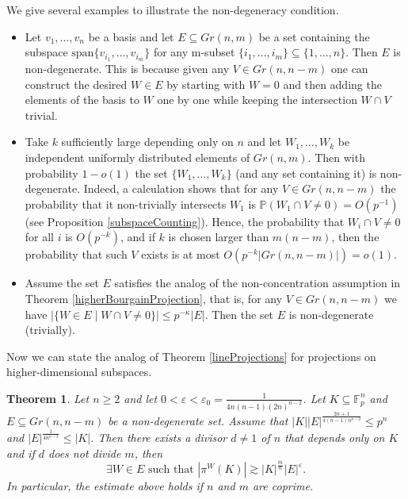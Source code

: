 \documentclass{amsart}
\newtheorem{theorem}{Theorem}[section]
\newcommand{\F}{\mathbb F}
\begin{document}
We give several examples to illustrate the non-degeneracy condition.
\begin{itemize}
    \item Let $v_1, \ldots, v_n$ be a basis and let $E \subseteq Gr(n, m)$ be a set containing the subspace $\text{span} \{v_{i_1}, \ldots, v_{i_m}\}$ for any m-subset $\{i_1, \ldots, i_m\} \subseteq \{1, \ldots, n\}$. Then $E$ is non-degenerate. This is because given any $V \in Gr(n, n - m)$ one can construct the desired $W \in E$ by starting with $W = 0$ and then adding the elements of the basis to $W$ one by one while keeping the intersection $W \cap V$ trivial.
    
    \item Take $k$ sufficiently large depending only on $n$ and let $W_1, \ldots, W_k$ be independent uniformly distributed elements of $Gr(n, m)$. Then with probability $1 - o(1)$ the set $\{W_1, \ldots, W_k\}$ (and any set containing it) is non-degenerate. Indeed, a calculation shows that for any $V \in Gr(n, n - m)$ the probability that it non-trivially intersects $W_1$ is $\mathbb{P}(W_1 \cap V \neq 0) = O(p^{-1})$ (see Proposition \ref{subspaceCounting}). Hence, the probability that $W_i \cap V \neq 0$ for all $i$ is $O(p^{-k})$, and if $k$ is chosen larger than $m(n - m)$, then the probability that such $V$ exists is at most $O(p^{-k}|Gr(n, n - m)|) = o(1)$.
    
    \item Assume the set $E$ satisfies the analog of the non-concentration assumption in Theorem \ref{higherBourgainProjection}, that is, for any $V \in Gr(n, n - m)$ we have $|\{W \in E \mid W \cap V \neq 0\}| \leq p^{-\kappa}|E|$. Then the set $E$ is non-degenerate (trivially).
\end{itemize}
Now we can state the analog of Theorem \ref{lineProjections} for projections on higher-dimensional subspaces.
\begin{theorem}\label{BourgainTypeProjections}
Let $n \geq 2$ and let $0<\varepsilon < \varepsilon_0 = \frac{1}{4n(n - 1)(2n)^{n - 2}}$. Let $K \subseteq \F_p^n$ and  $E \subseteq Gr(n, n - m)$ be a non-degenerate set. Assume that $|K| |E|^{\frac{2n + 1}{4(n - 1)n^{n - 2}}} \leq p^n$ and $|E|^{\frac{1}{4 n^{n - 2}}} \leq |K|$. Then there exists a divisor $d \neq 1$ of $n$ that depends only on $K$ and if $d$ does not divide $m$, then 
$$\exists W \in E \text{ such that } |\pi^{W}(K)| \gtrsim |K|^{\frac{m}{n}}|E|^{\varepsilon}.$$
In particular, the estimate above holds if $n$ and $m$ are coprime.
\end{theorem}
\end{document}
